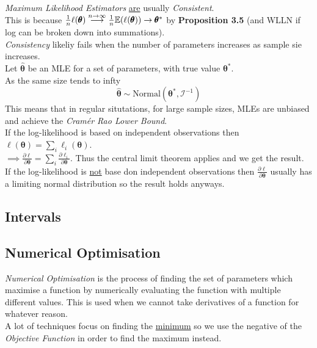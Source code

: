 \documentclass[11pt,a4paper]{article}
\begin{document}
\textit{Maximum Likelihood Estimators} \underline{are} usually \textit{Consistent}.\\
This is because $\frac1n\ell(\pmb\theta)\overset{n\to\infty}{\longrightarrow}\frac{1}{n}\mathbb{E}(\ell(\pmb\theta))\to\pmb\theta^*$ by \textbf{Proposition 3.5} (and WLLN if log can be broken down into summations).\\
\nb \textit{Consistency} likeliy fails when the number of parameters increases as sample sie increases.\\

Let $\hat{\pmb\theta}$ be an MLE for a set of parameters, with true value $\pmb\theta^*$.\\
As the same size tends to infty
$$\hat{\pmb\theta}\sim\text{Normal}(\pmb\theta^*,\mathcal{I}^{-1})$$
This means that in regular situtations, for large sample sizes, MLEs are unbiased and achieve the \textit{Cram\'er Rao Lower Bound}.\\

If the log-likelihood is based on independent observations then $\ell(\pmb\theta)=\sum_i\ell_i(\pmb\theta)$.\\
$\implies\frac{\partial\ell}{\partial\pmb\theta}=\sum_i\frac{\partial\ell_i}{\partial\pmb\theta}$.
Thus the central limit theorem applies and we get the result.\\
If the log-likelihood is \underline{not} base don independent observations then $\frac{\partial\ell}{\partial\pmb\theta}$ usually has a limiting normal distribution so the result holds anyways.

\subsection{Intervals}



\subsection{Numerical Optimisation}

\textit{Numerical Optimisation} is the process of finding the set of parameters which maximise a function by numerically evaluating the function with multiple different values. This is used when we cannot take derivatives of a function for whatever reason.\\
\nb A lot of techniques focus on finding the \underline{minimum} so we use the negative of the \textit{Objective Function} in order to find the maximum instead.\\
\end{document}
